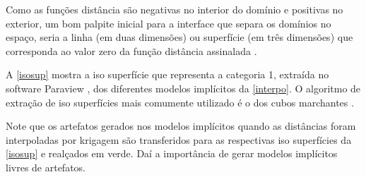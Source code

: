 Como as funções distância são negativas no interior do domínio e positivas no exterior, um bom palpite inicial para a interface que separa os domínios no espaço, seria a linha (em duas dimensões) ou superfície (em três dimensões) que corresponda ao valor zero da função distância assinalada \cite{wildedeutschcalibrate}. 

A \autoref{isosup} mostra a iso superfície que representa a categoria 1, extraída no software Paraview \cite{ahrens2005paraview}, dos diferentes modelos implícitos da \autoref{interpo}. O algoritmo de extração de iso superfícies mais comumente utilizado é o dos cubos marchantes \cite{lorensen1987marching}. 

Note que os artefatos gerados nos modelos implícitos quando as distâncias foram interpoladas por krigagem são transferidos para as respectivas iso superfícies da \autoref{isosup} e realçados em verde. Daí a importância de gerar modelos implícitos livres de artefatos.



